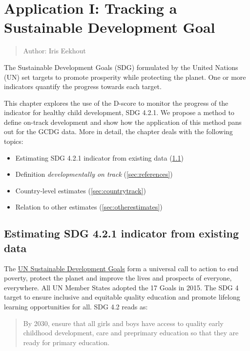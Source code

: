 \documentclass[
]{book}
\providecommand{\tightlist}{%
  \setlength{\itemsep}{0pt}\setlength{\parskip}{0pt}}
\begin{document}
\hypertarget{ch:SDGindicator}{%
\chapter{Application I: Tracking a Sustainable Development Goal}\label{ch:SDGindicator}}

\begin{quote}
Author: Iris Eekhout
\end{quote}

The Sustainable Development Goals (SDG) formulated by the United Nations (UN) set targets to promote prosperity while protecting the planet. One or more indicators quantify the progress towards each target.

This chapter explores the use of the D-score to monitor the progress of the indicator for healthy child development, SDG 4.2.1. We propose a method to define on-track development and show how the application of this method pans out for the GCDG data. More in detail, the chapter deals with the following topics:

\begin{itemize}
\tightlist
\item
  Estimating SDG 4.2.1 indicator from existing data (\ref{sec:application1})
\item
  Definition \emph{developmentally on track} (\ref{sec:references})
\item
  Country-level estimates (\ref{sec:countrytrack})
\item
  Relation to other estimates (\ref{sec:otherestimates})
\end{itemize}

\hypertarget{sec:application1}{%
\section{Estimating SDG 4.2.1 indicator from existing data}\label{sec:application1}}

The \href{https://www.un.org/sustainabledevelopment/development-agenda/}{UN Sustainable Development Goals} form a universal call to action to end poverty, protect the planet and improve the lives and prospects of everyone, everywhere. All UN Member States adopted the 17 Goals in 2015. The SDG 4 target to ensure inclusive and equitable quality education and promote lifelong learning opportunities for all. SDG 4.2 reads as:

\begin{quote}
By 2030, ensure that all girls and boys have access to quality early childhood development, care and preprimary education so that they are ready for primary education.
\end{quote}
\end{document}
